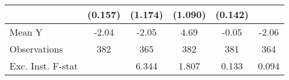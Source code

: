 {\begin{tabular}{l*{5}{c}}
            &     (0.157)         &     (1.174)         &     (1.090)         &     (0.142)         &                     \\
\midrule
Mean Y      &       -2.04         &       -2.05         &        4.69         &       -0.05         &       -2.06         \\
Observations&         382         &         365         &         382         &         381         &         364         \\
Exc. Inst. F-stat&                     &       6.344         &       1.807         &       0.133         &       0.094         \\
\bottomrule
\end{tabular}
}
